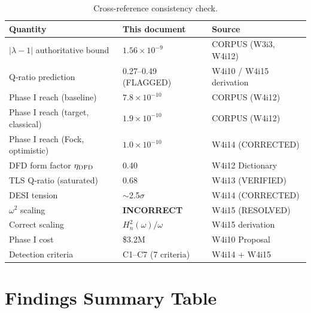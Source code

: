 \documentclass[11pt]{article}
\newcommand{\lbone}{|\lambda - 1|}
\newcommand{\ee}[1]{\times 10^{#1}}
\newcommand{\Heff}{H_n}
\theoremstyle{definition}
\theoremstyle{remark}
\begin{document}
\begin{table}[H]
\centering
\caption{Cross-reference consistency check.}
\label{tab:consistency}
\renewcommand{\arraystretch}{1.25}
\begin{tabular}{@{}lll@{}}
\toprule
\textbf{Quantity} & \textbf{This document} & \textbf{Source} \\
\midrule
$\lbone$ authoritative bound & $1.56\ee{-9}$ & CORPUS (W3i3, W4i12) \\
Q-ratio prediction & 0.27--0.49 (FLAGGED) & W4i10 / W4i15 derivation \\
Phase I reach (baseline) & $7.8\ee{-10}$ & CORPUS (W4i12) \\
Phase I reach (target, classical) & $1.9\ee{-10}$ & CORPUS (W4i12) \\
Phase I reach (Fock, optimistic) & $1.0\ee{-10}$ & W4i14 (CORRECTED) \\
DFD form factor $\eta_{\rm DFD}$ & 0.40 & W4i12 Dictionary \\
TLS Q-ratio (saturated) & 0.68 & W4i13 (VERIFIED) \\
DESI tension & $\sim$2.5$\sigma$ & W4i14 (CORRECTED) \\
$\omega^2$ scaling & \textbf{INCORRECT} & W4i15 (RESOLVED) \\
Correct scaling & $\Heff^2(\omega)/\omega$ & W4i15 derivation \\
Phase I cost & \$3.2M & W4i10 Proposal \\
Detection criteria & C1--C7 (7 criteria) & W4i14 + W4i15 \\
\bottomrule
\end{tabular}
\end{table}


\section{Findings Summary Table}
\end{document}
